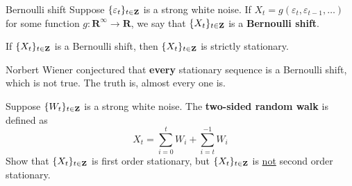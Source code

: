 \begin{Definition}{Bernoulli shift}{}
    Suppose $ \{\varepsilon_t\}_{t\in\mathbf{Z}} $ is a
    strong white noise. If $ X_t=g(\varepsilon_t,\varepsilon_{t-1},\ldots) $
    for some function $ g:\mathbf{R}^\infty \to \mathbf{R} $, we say that
    $ \{X_t\}_{t\in\mathbf{Z}} $ is a \textbf{Bernoulli shift}.
\end{Definition}
\begin{Theorem}{}{}
    If $ \{X_t\}_{t\in\mathbf{Z}} $ is a Bernoulli shift, then
    $ \{X_t\}_{t\in\mathbf{Z}} $ is strictly stationary.
\end{Theorem}
\begin{Remark}{}{}
    Norbert Wiener conjectured that \textbf{every} stationary
    sequence is a Bernoulli shift, which is not true. The truth is,
    almost every one is.
\end{Remark}
\begin{Exercise}{}{}
    Suppose $ \{W_t\}_{t\in\mathbf{Z}} $ is a strong white noise.
    The \textbf{two-sided random walk} is defined as
    \[ X_t=\sum_{i=0}^{t} W_i+\sum_{i=t}^{-1} W_i  \]
    Show that $ \{X_t\}_{t\in\mathbf{Z}} $ is first order stationary,
    but $ \{X_t\}_{t\in\mathbf{Z}} $ is \underline{not} second order stationary.
\end{Exercise}
